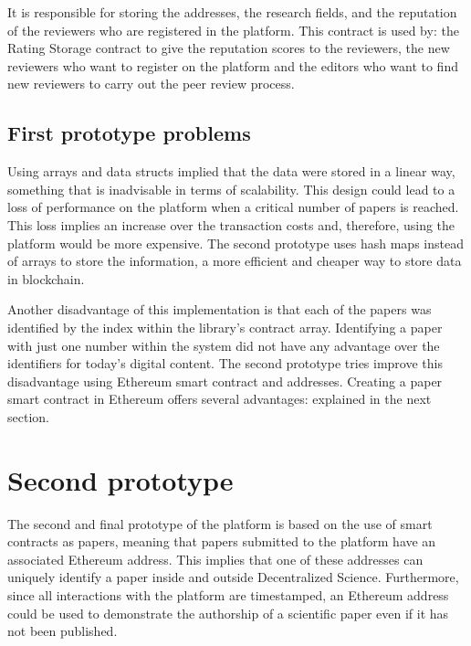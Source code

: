 It is responsible for storing the addresses, the research fields, and the
reputation of the reviewers who are registered in the platform. This contract is
used by: the Rating Storage contract to give the reputation scores to the
reviewers, the new reviewers who want to register on the platform and the
editors who want to find new reviewers to carry out the peer review process.

\subsection*{First prototype problems}
\label{sec:first-prot-probl}

Using arrays and data structs implied that the data were stored in a linear way,
something that is inadvisable in terms of scalability. This design could lead to
a loss of performance on the platform when a critical number of papers is
reached. This loss implies an increase over the transaction costs and,
therefore, using the platform would be more expensive. The second prototype uses
hash maps instead of arrays to store the information, a more efficient and
cheaper way to store data in blockchain.

Another disadvantage of this implementation is that each of the papers was
identified by the index within the library's contract array. Identifying a paper
with just one number within the system did not have any advantage over the
identifiers for today's digital content. The second prototype tries improve this
disadvantage using Ethereum smart contract and addresses. Creating a paper smart
contract in Ethereum offers several advantages: explained in the next section.

\section{Second prototype}
\label{sec:second-prototype}

The second and final prototype of the platform is based on the use of smart
contracts as papers, meaning that papers submitted to the platform have an
associated Ethereum address. This implies that one of these addresses can
uniquely identify a paper inside and outside Decentralized Science. Furthermore,
since all interactions with the platform are timestamped, an Ethereum address
could be used to demonstrate the authorship of a scientific paper even if it has
not been published.


